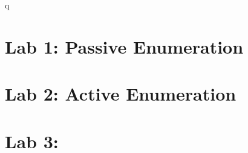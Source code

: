 \documentclass[oneside,openright,titlepage,numbers=noenddot,headinclude,footinclude=true,cleardoublepage=empty,listof=totoc,paper=a4,fontsize=11pt,english,BCOR=5mm]{scrreprt}
\begin{document}
  \frenchspacing
  \raggedbottom{}

  \pagestyle{plain}

  \singlespacing{}
  

  \onehalfspacing{}
  

  \cleardoublepage{}
  \pagestyle{scrheadings}
  \onehalfspacing{}
q
  \chapter{Lab 1: Passive Enumeration}\label{c:Lab-1}
  

  \chapter{Lab 2: Active Enumeration}\label{c:Lab-2}
  

  \chapter{Lab 3:}\label{c:Lab-3}
  







  \cleardoublepage{}
  \appendix

  \singlespacing{}
  
  \cleardoublepage{}
\end{document}
